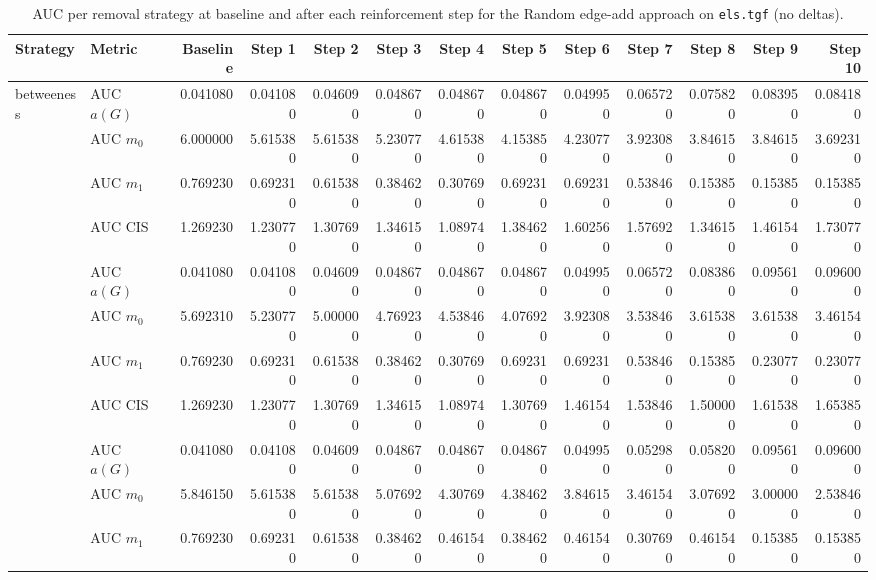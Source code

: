 \begin{table}[htbp]
  \centering
  \caption{AUC per removal strategy at baseline and after each reinforcement step for the Random edge-add approach on \texttt{els.tgf} (no deltas).}
  \label{tab:els-random_add-auc}
\setlength{\tabcolsep}{2.5pt}
  \begin{tabular}{llrrrrrrrrrrr}
    \toprule
    \textbf{Strategy} & \textbf{Metric} & \textbf{Baseline} & \textbf{Step 1} & \textbf{Step 2} & \textbf{Step 3} & \textbf{Step 4} & \textbf{Step 5} & \textbf{Step 6} & \textbf{Step 7} & \textbf{Step 8} & \textbf{Step 9} & \textbf{Step 10} \\
    \midrule
    \multirow{4}{*}{betweeness} & AUC $a(G)$ & 0.041080 & 0.041080 & 0.046090 & 0.048670 & 0.048670 & 0.048670 & 0.049950 & 0.065720 & 0.075820 & 0.083950 & 0.084180 \\
    & AUC $m_0$ & 6.000000 & 5.615380 & 5.615380 & 5.230770 & 4.615380 & 4.153850 & 4.230770 & 3.923080 & 3.846150 & 3.846150 & 3.692310 \\
    & AUC $m_1$ & 0.769230 & 0.692310 & 0.615380 & 0.384620 & 0.307690 & 0.692310 & 0.692310 & 0.538460 & 0.153850 & 0.153850 & 0.153850 \\
    & AUC CIS & 1.269230 & 1.230770 & 1.307690 & 1.346150 & 1.089740 & 1.384620 & 1.602560 & 1.576920 & 1.346150 & 1.461540 & 1.730770 \\
    \addlinespace
    \multirow{4}{*}{closeness} & AUC $a(G)$ & 0.041080 & 0.041080 & 0.046090 & 0.048670 & 0.048670 & 0.048670 & 0.049950 & 0.065720 & 0.083860 & 0.095610 & 0.096000 \\
    & AUC $m_0$ & 5.692310 & 5.230770 & 5.000000 & 4.769230 & 4.538460 & 4.076920 & 3.923080 & 3.538460 & 3.615380 & 3.615380 & 3.461540 \\
    & AUC $m_1$ & 0.769230 & 0.692310 & 0.615380 & 0.384620 & 0.307690 & 0.692310 & 0.692310 & 0.538460 & 0.153850 & 0.230770 & 0.230770 \\
    & AUC CIS & 1.269230 & 1.230770 & 1.307690 & 1.346150 & 1.089740 & 1.307690 & 1.461540 & 1.538460 & 1.500000 & 1.615380 & 1.653850 \\
    \addlinespace
    \multirow{4}{*}{core influence} & AUC $a(G)$ & 0.041080 & 0.041080 & 0.046090 & 0.048670 & 0.048670 & 0.048670 & 0.049950 & 0.052980 & 0.058200 & 0.095610 & 0.096000 \\
    & AUC $m_0$ & 5.846150 & 5.615380 & 5.615380 & 5.076920 & 4.307690 & 4.384620 & 3.846150 & 3.461540 & 3.076920 & 3.000000 & 2.538460 \\
    & AUC $m_1$ & 0.769230 & 0.692310 & 0.615380 & 0.384620 & 0.461540 & 0.384620 & 0.461540 & 0.307690 & 0.461540 & 0.153850 & 0.153850 \\

\end{tabular}
\end{table}
